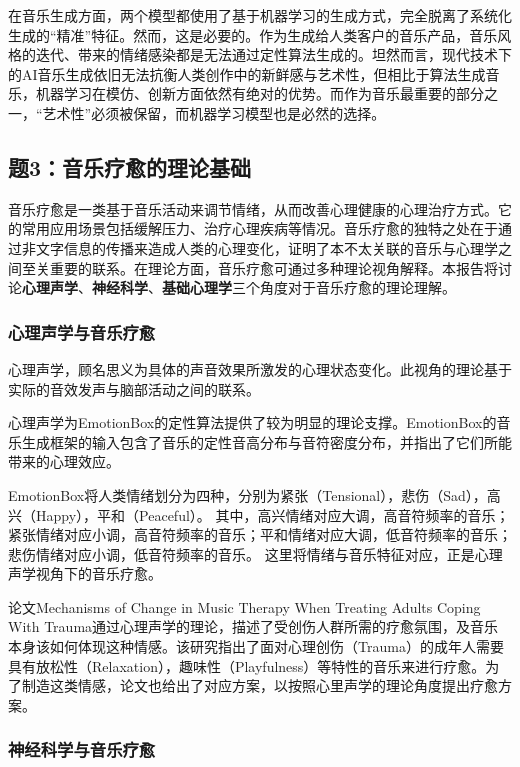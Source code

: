 \documentclass[12pt, fontset=windows]{ctexart}
\begin{document}
在音乐生成方面，两个模型都使用了基于机器学习的生成方式，完全脱离了系统化生成的“精准”特征。然而，这是必要的。作为生成给人类客户的音乐产品，音乐风格的迭代、带来的情绪感染都是无法通过定性算法生成的。坦然而言，现代技术下的AI音乐生成依旧无法抗衡人类创作中的新鲜感与艺术性，但相比于算法生成音乐，机器学习在模仿、创新方面依然有绝对的优势。而作为音乐最重要的部分之一，“艺术性”必须被保留，而机器学习模型也是必然的选择。

\subsection{题3：音乐疗愈的理论基础}
音乐疗愈是一类基于音乐活动来调节情绪，从而改善心理健康的心理治疗方式。它的常用应用场景包括缓解压力、治疗心理疾病等情况。音乐疗愈的独特之处在于通过非文字信息的传播来造成人类的心理变化，证明了本不太关联的音乐与心理学之间至关重要的联系。在理论方面，音乐疗愈可通过多种理论视角解释。本报告将讨论\textbf{心理声学}、\textbf{神经科学}、\textbf{基础心理学}三个角度对于音乐疗愈的理论理解。

\subsubsection{心理声学与音乐疗愈}

心理声学，顾名思义为具体的声音效果所激发的心理状态变化。此视角的理论基于实际的音效发声与脑部活动之间的联系。

心理声学为EmotionBox的定性算法提供了较为明显的理论支撑。EmotionBox的音乐生成框架的输入包含了音乐的定性音高分布与音符密度分布，并指出了它们所能带来的心理效应。

EmotionBox将人类情绪划分为四种，分别为紧张（Tensional），悲伤（Sad），高兴（Happy），平和（Peaceful）。
其中，高兴情绪对应大调，高音符频率的音乐；紧张情绪对应小调，高音符频率的音乐；平和情绪对应大调，低音符频率的音乐；悲伤情绪对应小调，低音符频率的音乐。
这里将情绪与音乐特征对应，正是心理声学视角下的音乐疗愈。

论文Mechanisms of Change in Music Therapy When Treating Adults Coping With Trauma通过心理声学的理论，描述了受创伤人群所需的疗愈氛围，及音乐本身该如何体现这种情感。该研究指出了面对心理创伤（Trauma）的成年人需要具有放松性（Relaxation），趣味性（Playfulness）等特性的音乐来进行疗愈。为了制造这类情感，论文也给出了对应方案，以按照心里声学的理论角度提出疗愈方案。

\subsubsection{神经科学与音乐疗愈}
\end{document}
